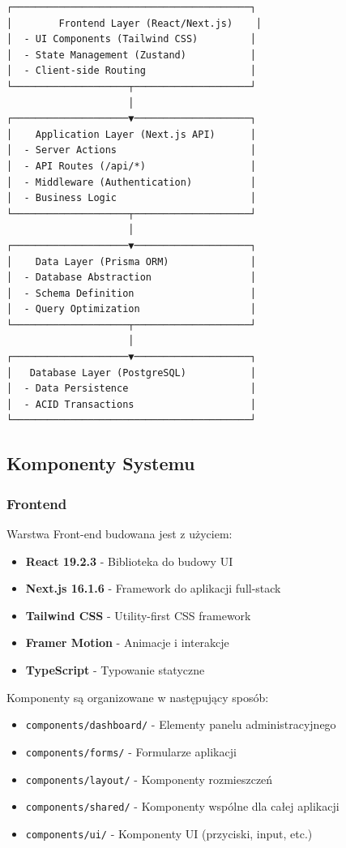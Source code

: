 \documentclass[12pt,a4paper,utf-8]{article}
\begin{document}
\begin{verbatim}
┌─────────────────────────────────────────┐
│        Frontend Layer (React/Next.js)    │
│  - UI Components (Tailwind CSS)         │
│  - State Management (Zustand)           │
│  - Client-side Routing                  │
└────────────────────┬────────────────────┘
                     │
┌────────────────────▼────────────────────┐
│    Application Layer (Next.js API)      │
│  - Server Actions                       │
│  - API Routes (/api/*)                  │
│  - Middleware (Authentication)          │
│  - Business Logic                       │
└────────────────────┬────────────────────┘
                     │
┌────────────────────▼────────────────────┐
│    Data Layer (Prisma ORM)              │
│  - Database Abstraction                 │
│  - Schema Definition                    │
│  - Query Optimization                   │
└────────────────────┬────────────────────┘
                     │
┌────────────────────▼────────────────────┐
│   Database Layer (PostgreSQL)           │
│  - Data Persistence                     │
│  - ACID Transactions                    │
└─────────────────────────────────────────┘
\end{verbatim}

\subsection{Komponenty Systemu}

\subsubsection{Frontend}

Warstwa Front-end budowana jest z użyciem:
\begin{itemize}
    \item \textbf{React 19.2.3}  -  Biblioteka do budowy UI
    \item \textbf{Next.js 16.1.6}  -  Framework do aplikacji full-stack
    \item \textbf{Tailwind CSS}  -  Utility-first CSS framework
    \item \textbf{Framer Motion}  -  Animacje i interakcje
    \item \textbf{TypeScript}  -  Typowanie statyczne
\end{itemize}

Komponenty są organizowane w następujący sposób:
\begin{itemize}
    \item \texttt{components/dashboard/}  -  Elementy panelu administracyjnego
    \item \texttt{components/forms/}  -  Formularze aplikacji
    \item \texttt{components/layout/}  -  Komponenty rozmieszczeń
    \item \texttt{components/shared/}  -  Komponenty wspólne dla całej aplikacji
    \item \texttt{components/ui/}  -  Komponenty UI (przyciski, input, etc.)
\end{itemize}
\end{document}
